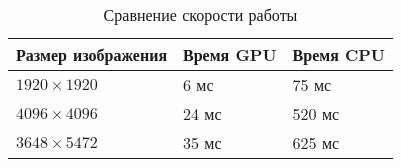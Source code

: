 \begin{table}[H]
    \centering
    \begin{tabularx}{\textwidth}{| X | X | X |}
        \hline
        \textbf{Размер изображения} & \textbf{Время GPU} & \textbf{Время CPU} \\ \hline
        $1920\times 1920$           & 6 мс               & 75 мс              \\ \hline
        $4096\times 4096$           & 24 мс              & 520 мс             \\ \hline
        $3648\times 5472$           & 35 мс              & 625 мс             \\ \hline
    \end{tabularx}
    \caption{Сравнение скорости работы}
\end{table}

